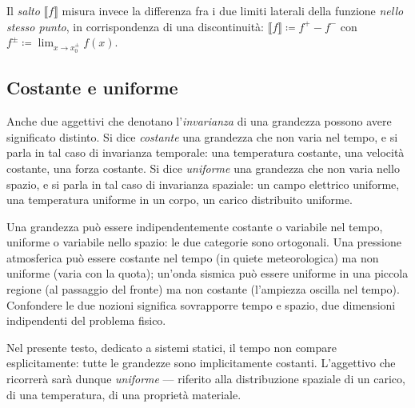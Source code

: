 Il \textit{salto} $\llbracket f \rrbracket$ misura invece la 
differenza fra i due limiti laterali della funzione 
\emph{nello stesso punto}, in corrispondenza di una 
discontinuità: $\llbracket f \rrbracket \coloneqq f^+ - f^-$ con 
$f^\pm \coloneqq \lim_{x\to x_0^\pm} f(x)$. 




\subsection{Costante e uniforme}\label{sec:costante_uniforme}


Anche due aggettivi che denotano l'\emph{invarianza} di una
grandezza possono avere significato distinto. Si dice 
\textit{costante} una grandezza che non varia nel tempo, e si
parla in tal caso di invarianza temporale: una temperatura
costante, una velocità costante, una forza costante. Si dice
\textit{uniforme} una grandezza che non varia nello spazio, e
si parla in tal caso di invarianza spaziale: un campo elettrico
uniforme, una temperatura uniforme in un corpo, un carico
distribuito uniforme.

Una grandezza può essere indipendentemente costante o variabile
nel tempo, uniforme o variabile nello spazio: le due categorie
sono ortogonali. Una pressione atmosferica può essere costante
nel tempo (in quiete meteorologica) ma non uniforme (varia con
la quota); un'onda sismica può essere uniforme in una piccola
regione (al passaggio del fronte) ma non costante (l'ampiezza
oscilla nel tempo). Confondere le due nozioni significa
sovrapporre tempo e spazio, due dimensioni indipendenti del
problema fisico.

Nel presente testo, dedicato a sistemi statici, il tempo non
compare esplicitamente: tutte le grandezze sono implicitamente
costanti. L'aggettivo che ricorrerà sarà dunque
\emph{uniforme} --- riferito alla distribuzione spaziale di un
carico, di una temperatura, di una proprietà materiale.



